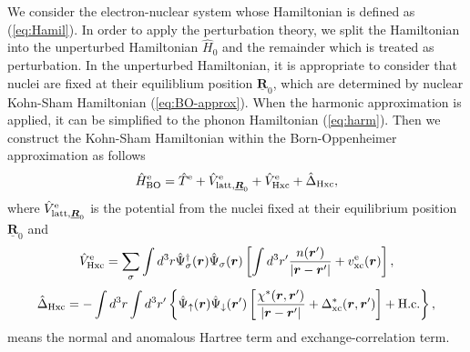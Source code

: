 We consider the electron-nuclear system whose Hamiltonian is defined as (\ref{eq:Hamil}).
In order to apply the perturbation theory, we split the Hamiltonian into the unperturbed
Hamiltonian $\hat{H}_0$ and the remainder which is treated as perturbation.
In the unperturbed Hamiltonian, it is appropriate to consider that nuclei are fixed at their
equiliblium position $\underline{{\bm R}}_0$, which are determined by nuclear 
Kohn-Sham Hamiltonian (\ref{eq:BO-approx}). When the harmonic approximation is applied,
it can be simplified to the phonon Hamiltonian (\ref{eq:harm}).
%
Then we construct the Kohn-Sham Hamiltonian within the Born-Oppenheimer approximation as follows
%
\begin{equation}
	\hat{H}^{\rm e}_{\rm BO} = \hat{T}^{\rm e} + \hat{V}^{\rm e}_{{\rm latt},\underline{{\bm R}}_0}
	+ \hat{V}^{\rm e}_{\rm Hxc} + \hat{\Delta}_{\rm Hxc},
	\label{eq:BO-KS}
\end{equation}
%
where $\hat{V}^{\rm e}_{{\rm latt},\underline{\bm R}_0}$ is the potential from the nuclei fixed at their
equilibrium position $\underline{\bm R}_0$ and 
%
\begin{equation}
	\hat{V}^{\rm e}_{\rm Hxc} = \sum_{\sigma}\int d^3r\hat{\Psi}^{\dag}_{\sigma}({\bm r})
	\hat{\Psi}_{\sigma}({\bm r}) 
	\left[
		\int d^3r' \frac{n({\bm r'})}{|{\bm r}-{\bm r'}|} + v^{\rm e}_{\rm xc}(\bm r)
	\right],
\end{equation}
%
\begin{equation}
\begin{split}
	\hat{\Delta}_{\rm Hxc} = -\int d^3r \int d^3r'
	\left\{
		\hat{\Psi}_\uparrow({\bm r})\hat{\Psi}_\downarrow({\bm r'})
		\left[
			\frac{\chi^\ast({\bm r}, {\bm r'})}{|{\bm r}-{\bm r'}|} 
			+ \Delta^\ast_{\rm xc}({\bm r}, {\bm r'})
		\right]
		+ {\rm H.c.}
	\right\},
	\label{eq:DeltaHxc}
\end{split}
\end{equation}
%
means the normal and anomalous Hartree term and exchange-correlation term.

